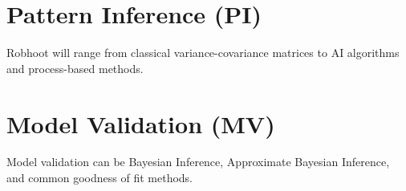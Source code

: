 \documentclass[english,12pt]{article}
\begin{document}
\section{Pattern Inference (PI)}

Robhoot will range from classical variance-covariance matrices to AI
algorithms and process-based methods.

\section{Model Validation (MV)}

Model validation can be Bayesian Inference, Approximate Bayesian
Inference, and common goodness of fit methods.

\end{document}
